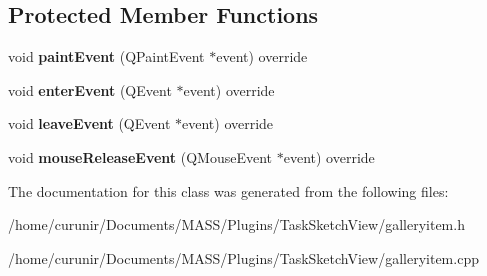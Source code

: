 \subsection*{Protected Member Functions}
\begin{DoxyCompactItemize}
\item 
void {\bfseries paint\+Event} (Q\+Paint\+Event $\ast$event) override\hypertarget{class_gallery_item_a75d0afa0d561668b65a5f158efb7e7ce}{}\label{class_gallery_item_a75d0afa0d561668b65a5f158efb7e7ce}

\item 
void {\bfseries enter\+Event} (Q\+Event $\ast$event) override\hypertarget{class_gallery_item_a54f8de85efd7cde206458ce0ac5ad3a3}{}\label{class_gallery_item_a54f8de85efd7cde206458ce0ac5ad3a3}

\item 
void {\bfseries leave\+Event} (Q\+Event $\ast$event) override\hypertarget{class_gallery_item_afff165e5f0d9dcda2ce175cd44f58885}{}\label{class_gallery_item_afff165e5f0d9dcda2ce175cd44f58885}

\item 
void {\bfseries mouse\+Release\+Event} (Q\+Mouse\+Event $\ast$event) override\hypertarget{class_gallery_item_a6565352fbaf2708e2483f12a499ef31f}{}\label{class_gallery_item_a6565352fbaf2708e2483f12a499ef31f}

\end{DoxyCompactItemize}


The documentation for this class was generated from the following files\+:\begin{DoxyCompactItemize}
\item 
/home/curunir/\+Documents/\+M\+A\+S\+S/\+Plugins/\+Task\+Sketch\+View/galleryitem.\+h\item 
/home/curunir/\+Documents/\+M\+A\+S\+S/\+Plugins/\+Task\+Sketch\+View/galleryitem.\+cpp\end{DoxyCompactItemize}
